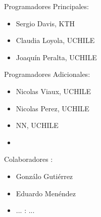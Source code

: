\documentclass[a4paper,10pt]{scrbook}
\begin{document}
Programadores Principales:

\begin{itemize}
 \item Sergio Davis, KTH
 \item Claudia Loyola, UCHILE
 \item Joaqu\'in Peralta, UCHILE
\end{itemize}

Programadores Adicionales:

\begin{itemize}
 \item Nicolas Viaux, UCHILE
 \item Nicolas Perez, UCHILE
 \item NN, UCHILE
 \item 
\end{itemize}

Colaboradores :

\begin{itemize}
 \item Gonz\'alo Guti\'errez
 \item Eduardo Men\'endez
\end{itemize}


\begin{itemize}
 \item ... : ...
\end{itemize}
\end{document}
